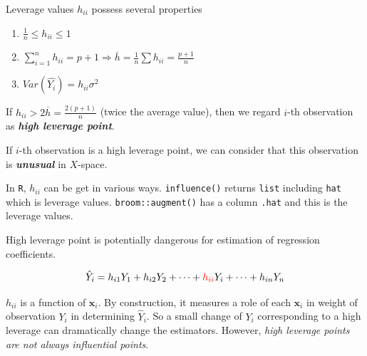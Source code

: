 \documentclass[]{book}
\newenvironment{Shaded}{\begin{snugshade}}{\end{snugshade}}
\newcommand{\CommentTok}[1]{\textcolor[rgb]{0.56,0.35,0.01}{\textit{#1}}}
\newcommand{\KeywordTok}[1]{\textcolor[rgb]{0.13,0.29,0.53}{\textbf{#1}}}
\newcommand{\NormalTok}[1]{#1}
\newcommand{\OperatorTok}[1]{\textcolor[rgb]{0.81,0.36,0.00}{\textbf{#1}}}
\newcommand{\StringTok}[1]{\textcolor[rgb]{0.31,0.60,0.02}{#1}}
\theoremstyle{definition}
\theoremstyle{definition}
\theoremstyle{definition}
\theoremstyle{remark}
\let\BeginKnitrBlock\begin \let\EndKnitrBlock\end
\begin{document}
\BeginKnitrBlock{proposition}[Properties of $h_{ii}$]
\protect\hypertarget{prp:hii}{}{\label{prp:hii} {} }Leverage values \(h_{ii}\) possess several properties

\begin{enumerate}
  \item $\frac{1}{n} \le h_{ii} \le 1$
  \item $\sum\limits_{i = 1}^n h_{ii} = p + 1 \Rightarrow \overline{h} = \frac{1}{n} \sum h_{ii} = \frac{p + 1}{n}$
  \item $Var(\hat{Y_i}) = h_{ii}\sigma^2$
\end{enumerate}
\EndKnitrBlock{proposition}

\BeginKnitrBlock{conjecture}[High leverage point]
\protect\hypertarget{cnj:highlev}{}{\label{cnj:highlev} {} }If \(h_{ii} > 2\overline{h} = \frac{2(p + 1)}{n}\) (twice the average value), then we regard \(i\)-th observation as \textbf{\textit{high leverage point}}.

If \(i\)-th observation is a high leverage point, we can consider that this observation is \textbf{\textit{unusual}} in \(X\)-space.
\EndKnitrBlock{conjecture}

In \texttt{R}, \(h_{ii}\) can be get in various ways. \texttt{influence()} returns \texttt{list} including \texttt{hat} which is leverage values. \texttt{broom::augment()} has a column \texttt{.hat} and this is the leverage values.

\begin{Shaded}
\end{Shaded}

High leverage point is potentially dangerous for estimation of regression coefficients.

\[\hat{Y}_i = h_{i1} Y_1 + h_{i2} Y_2 + \cdots + {\color{red}{h_{ii}}} Y_i + \cdots + h_{in} Y_n\]

\(h_{ii}\) is a function of \(\mathbf{x}_i\). By construction, it measures a role of each \(\mathbf{x}_i\) in weight of observation \(Y_i\) in determining \(\hat{Y}_i\). So a small change of \(Y_i\) corresponding to a high leverage can dramatically change the estimators. However, \emph{high leverage points are not always influential points}.
\end{document}
